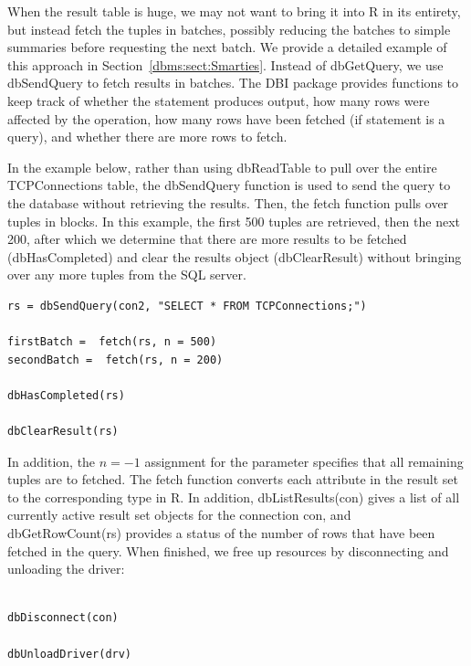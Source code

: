 When the result table is huge, we may not want to bring it into
R in its entirety, but instead fetch the tuples in batches,
possibly reducing the batches to simple summaries before 
requesting the next batch.  We provide a detailed example of
this approach in Section~\ref{dbms:sect:Smarties}.
Instead of dbGetQuery, we use dbSendQuery to fetch results in batches.
The DBI package provides functions to keep track of whether the 
statement produces output, 
how many rows were affected by the operation, 
how many rows have been fetched (if statement is a query), 
and whether there are more rows to fetch.

In the example below, rather than using dbReadTable to
pull over the entire TCPConnections table, the dbSendQuery
function is used to send the query to the database without
retrieving the results.  Then, the fetch function pulls
over tuples in blocks. In this example, the first 500 tuples
are retrieved, then the next 200, after which we determine that
there are more results to be fetched (dbHasCompleted) 
and clear the results object (dbClearResult) without
bringing over any more tuples from the SQL server.
\begin{verbatim}
rs = dbSendQuery(con2, "SELECT * FROM TCPConnections;")

firstBatch =  fetch(rs, n = 500)
secondBatch =  fetch(rs, n = 200)

dbHasCompleted(rs)

dbClearResult(rs)
\end{verbatim}

In addition, the $n = -1$ assignment for the parameter specifies
that all remaining tuples are to fetched. 
The fetch function converts each attribute in the result set 
to the corresponding type in R.
In addition, dbListResults(con) gives a 
list of all currently active result set objects for the 
connection con, and   dbGetRowCount(rs) provides a status
of the number of rows that have been fetched in the query.
When finished, we free up resources by disconnecting
and unloading the driver:
\begin{verbatim}

dbDisconnect(con) 

dbUnloadDriver(drv)
\end{verbatim}





